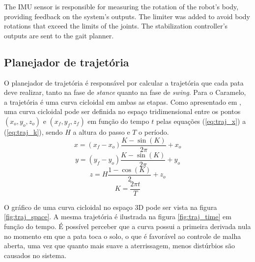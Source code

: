 \documentclass[conference]{IEEEtran}
\begin{document}
The IMU sensor is responsible for measuring the rotation of the robot's body, providing feedback on the system's outputs. The limiter was added to avoid body rotations that exceed the limits of the joints. The stabilization controller's outputs are sent to the gait planner.


\subsection{Planejador de trajetória}

O planejador de trajetória é responsável por calcular a trajetória que cada pata deve realizar, tanto na fase de \textit{stance} quanto na fase de \textit{swing}. Para o Caramelo, a trajetória é uma curva cicloidal em ambas as etapas. Como apresentado em \cite{Shi2021}, uma curva cicloidal pode ser definida no espaço tridimensional entre os pontos $(x_o, y_o, z_o)$ e $(x_f, y_f, z_f)$ em função do tempo $t$ pelas equações (\ref{eq:traj_x}) a (\ref{eq:traj_k}), sendo $H$ a altura do passo e $T$ o período.
\begin{equation}
  x = (x_f - x_o) \frac{K - \sin{(K)}}{2 \pi} + x_o
  \label{eq:traj_x}
\end{equation}
\begin{equation}
  y = (y_f - y_o) \frac{K - \sin{(K)}}{2 \pi} + y_o
  \label{eq:traj_y}
\end{equation}
\begin{equation}
  z = H \frac{1 - \cos{(K)}}{2} + z_o
  \label{eq:traj_z}
\end{equation}
\begin{equation}
  K = \frac{2 \pi t}{T}
  \label{eq:traj_k}
\end{equation}

O gráfico de uma curva cicloidal no espaço 3D pode ser vista na figura \ref{fig:traj_space}. A mesma trajetória é ilustrada na figura \ref{fig:traj_time} em função do tempo. É possível perceber que a curva possui a primeira derivada nula no momento em que a pata toca o solo, o que é favorável ao controle de malha aberta, uma vez que quanto mais suave a aterrissagem, menos distúrbios são causados no sistema.
\end{document}
